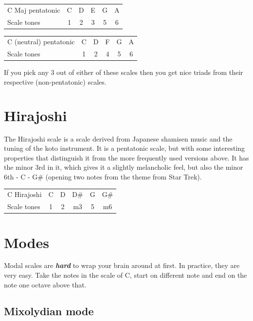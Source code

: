\documentclass[
  12pt,
  letterpaper,
  oneside,
  open=any]{scrbook}
\begin{document}
\begin{longtable}[]{@{}lccccc@{}}
\toprule\noalign{}
\endhead
\bottomrule\noalign{}
\endlastfoot
C Maj pentatonic & C & D & E & G & A \\
Scale tones & 1 & 2 & 3 & 5 & 6 \\
\end{longtable}

\begin{longtable}[]{@{}lccccc@{}}
\toprule\noalign{}
\endhead
\bottomrule\noalign{}
\endlastfoot
C (neutral) pentatonic & C & D & F & G & A \\
Scale tones & 1 & 2 & 4 & 5 & 6 \\
\end{longtable}

If you pick any 3 out of either of these scales then you get nice triads
from their respective (non-pentatonic) scales.

\section{Hirajoshi}\label{hirajoshi}

The Hirajoshi scale is a scale derived from Japanese shamisen music and
the tuning of the koto instrument. It is a pentatonic scale, but with
some interesting properties that distinguish it from the more frequently
used versions above. It has the minor 3rd in it, which gives it a
slightly melancholic feel, but also the minor 6th - C - G\# (opening two
notes from the theme from Star Trek).

\begin{longtable}[]{@{}lccccc@{}}
\toprule\noalign{}
\endhead
\bottomrule\noalign{}
\endlastfoot
C Hirajoshi & C & D & D\# & G & G\# \\
Scale tones & 1 & 2 & m3 & 5 & m6 \\
\end{longtable}

\section{Modes}\label{modes}

Modal scales are \textbf{\emph{hard}} to wrap your brain around at
first. In practice, they are very easy. Take the notes in the scale of
C, start on different note and end on the note one octave above that.

\subsection{Mixolydian mode}\label{mixolydian-mode}
\end{document}

